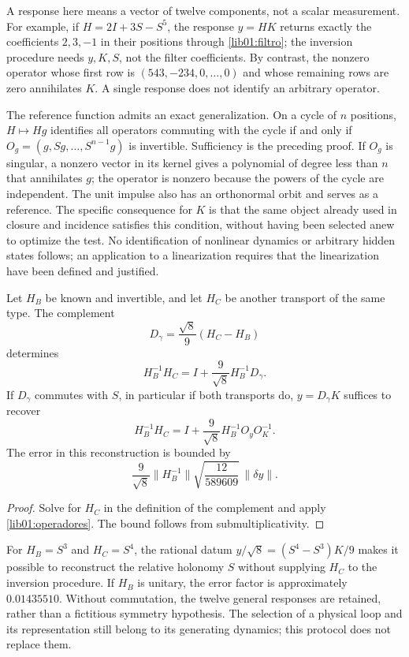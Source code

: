 A response here means a vector of twelve components, not a scalar measurement. For example, if \(H=2I+3S-S^5\), the response \(y=HK\) returns exactly the coefficients \(2,3,-1\) in their positions through \eqref{lib01:filtro}; the inversion procedure needs \(y,K,S\), not the filter coefficients. By contrast, the nonzero operator whose first row is \((543,-234,0,\ldots,0)\) and whose remaining rows are zero annihilates \(K\). A single response does not identify an arbitrary operator.

The reference function admits an exact generalization. On a cycle of \(n\) positions, \(H\mapsto Hg\) identifies all operators commuting with the cycle if and only if \(O_g=(g,Sg,\ldots,S^{n-1}g)\) is invertible. Sufficiency is the preceding proof. If \(O_g\) is singular, a nonzero vector in its kernel gives a polynomial of degree less than \(n\) that annihilates \(g\); the operator is nonzero because the powers of the cycle are independent. The unit impulse also has an orthonormal orbit and serves as a reference. The specific consequence for \(K\) is that the same object already used in closure and incidence satisfies this condition, without having been selected anew to optimize the test. No identification of nonlinear dynamics or arbitrary hidden states follows; an application to a linearization requires that the linearization have been defined and justified.

\begin{corollary}
\label{lib01:holonomia}
Let \(H_B\) be known and invertible, and let \(H_C\) be another transport of the same type. The complement
\[
 D_\gamma=\frac{\sqrt8}{9}(H_C-H_B)
\]
determines
\[
 H_B^{-1}H_C=I+\frac9{\sqrt8}H_B^{-1}D_\gamma.
\]
If \(D_\gamma\) commutes with \(S\), in particular if both transports do, \(y=D_\gamma K\) suffices to recover
\begin{equation}
 H_B^{-1}H_C
 =I+\frac9{\sqrt8}H_B^{-1}O_yO_K^{-1}.
 \label{lib01:holonomia-una-respuesta}
\end{equation}
The error in this reconstruction is bounded by
\[
 \frac9{\sqrt8}\|H_B^{-1}\|
 \sqrt{\frac{12}{589609}}\,\|\delta y\|.
\]
\end{corollary}
\begin{proof}
Solve for \(H_C\) in the definition of the complement and apply \cref{lib01:operadores}. The bound follows from submultiplicativity.
\end{proof}

For \(H_B=S^3\) and \(H_C=S^4\), the rational datum \(y/\sqrt8=(S^4-S^3)K/9\) makes it possible to reconstruct the relative holonomy \(S\) without supplying \(H_C\) to the inversion procedure. If \(H_B\) is unitary, the error factor is approximately \(0.01435510\). Without commutation, the twelve general responses are retained, rather than a fictitious symmetry hypothesis. The selection of a physical loop and its representation still belong to its generating dynamics; this protocol does not replace them.

